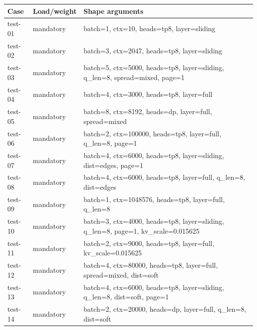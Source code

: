 \documentclass[11pt,letterpaper]{article}
\begin{document}
\footnotesize\begin{longtable}{@{}p{.13\linewidth}p{.30\linewidth}p{.51\linewidth}@{}}\toprule\textbf{Case} & \textbf{Load/weight} & \textbf{Shape arguments}\\\midrule\endhead

test-01 & mandatory & batch=1, ctx=10, heads=tp8, layer=sliding\\

test-02 & mandatory & batch=3, ctx=2047, heads=tp8, layer=sliding\\

test-03 & mandatory & batch=5, ctx=5000, heads=tp8, layer=sliding, q\_len=8, spread=mixed, page=1\\

test-04 & mandatory & batch=4, ctx=3000, heads=tp8, layer=full\\

test-05 & mandatory & batch=8, ctx=8192, heads=dp, layer=full, spread=mixed\\

test-06 & mandatory & batch=2, ctx=100000, heads=tp8, layer=full, q\_len=8, page=1\\

test-07 & mandatory & batch=4, ctx=6000, heads=tp8, layer=sliding, dist=edges, page=1\\

test-08 & mandatory & batch=4, ctx=6000, heads=tp8, layer=full, q\_len=8, dist=edges\\

test-09 & mandatory & batch=1, ctx=1048576, heads=tp8, layer=full, q\_len=8\\

test-10 & mandatory & batch=3, ctx=4000, heads=tp8, layer=sliding, q\_len=8, page=1, kv\_scale=0.015625\\

test-11 & mandatory & batch=2, ctx=9000, heads=tp8, layer=full, kv\_scale=0.015625\\

test-12 & mandatory & batch=4, ctx=80000, heads=tp8, layer=full, spread=mixed, dist=soft\\

test-13 & mandatory & batch=4, ctx=6000, heads=tp8, layer=sliding, q\_len=8, dist=soft, page=1\\

test-14 & mandatory & batch=2, ctx=20000, heads=dp, layer=full, q\_len=8, dist=soft\\


\end{longtable}
\end{document}
